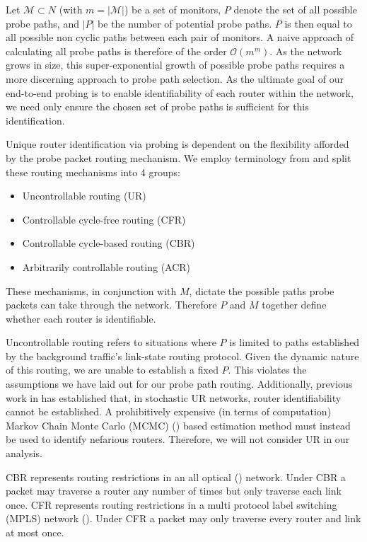 Let $\mathcal{M}\subset N$ (with $m=|\mathcal{M}|$) be a set of monitors, $P$ denote the set of all possible probe paths, and $|P|$ be the number of potential probe paths. $P$ is then equal to all possible non cyclic paths between each pair of monitors. A naive approach of calculating all probe paths is therefore of the order $\mathcal{O}(m^m)$. As the network grows in size, this super-exponential growth of possible probe paths requires a more discerning approach to probe path selection. As the ultimate goal of our end-to-end probing is to enable identifiability of each router within the network, we need only ensure the chosen set of probe paths is sufficient for this identification.\par

Unique router identification via probing is dependent on the flexibility afforded by the probe packet routing mechanism. We employ terminology from \cite{he_network_2021} and split these routing mechanisms into 4 groups: \begin{itemize}
    \item Uncontrollable routing (UR)
    \item Controllable cycle-free routing (CFR)
    \item Controllable cycle-based routing (CBR)
    \item Arbitrarily controllable routing (ACR)
\end{itemize}
These mechanisms, in conjunction with $M$, dictate the possible paths probe packets can take through the network. Therefore $P$ and $M$ together define whether each router is identifiable.\par
Uncontrollable routing refers to situations where $P$ is limited to paths established by the background traffic's link-state routing protocol. Given the dynamic nature of this routing, we are unable to establish a fixed $P$. This violates the assumptions we have laid out for our probe path routing. Additionally, previous work in \cite{barnes_stochastic_2020} has established that, in stochastic UR networks, router identifiability cannot be established. A prohibitively expensive (in terms of computation) Markov Chain Monte Carlo (MCMC) (\cite{dellaportas_bayesian_2002}) based estimation method must instead be used to identify nefarious routers. Therefore, we will not consider UR in our analysis.\par
CBR represents routing restrictions in an all optical (\cite{ahuja_srlg_2011}) network. Under CBR a packet may traverse a router any number of times but only traverse each link once. CFR represents routing restrictions in a multi protocol label switching (MPLS) network (\cite{rosen_multiprotocol_2001}). Under CFR a packet may only traverse every router and link at most once.\par
